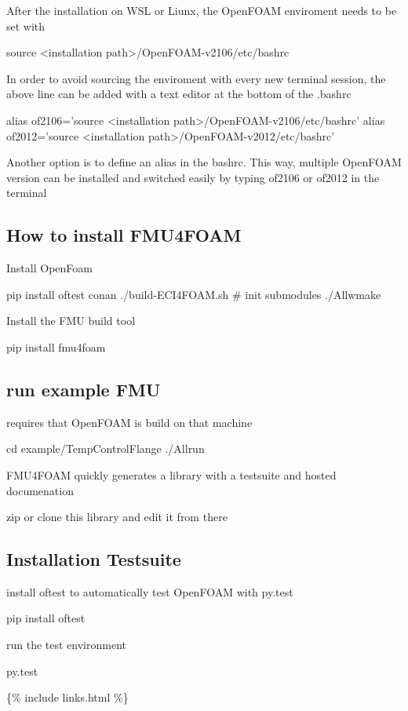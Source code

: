 After the installation on W\+SL or Liunx, the Open\+F\+O\+AM enviroment needs to be set with


\begin{DoxyCode}
source <installation path>/OpenFOAM-v2106/etc/bashrc
\end{DoxyCode}


In order to avoid sourcing the enviroment with every new terminal session, the above line can be added with a text editor at the bottom of the .bashrc


\begin{DoxyCode}
alias of2106='source <installation path>/OpenFOAM-v2106/etc/bashrc'
alias of2012='source <installation path>/OpenFOAM-v2012/etc/bashrc'
\end{DoxyCode}


Another option is to define an alias in the bashrc. This way, multiple Open\+F\+O\+AM version can be installed and switched easily by typing of2106 or of2012 in the terminal

\subsection*{How to install F\+M\+U4\+F\+O\+AM}

Install Open\+Foam 
\begin{DoxyCode}
pip install oftest conan
./build-ECI4FOAM.sh # init submodules
./Allwmake
\end{DoxyCode}


Install the F\+MU build tool


\begin{DoxyCode}
pip install fmu4foam
\end{DoxyCode}


\subsection*{run example F\+MU}

requires that Open\+F\+O\+AM is build on that machine


\begin{DoxyCode}
cd example/TempControlFlange
./Allrun
\end{DoxyCode}


F\+M\+U4\+F\+O\+AM quickly generates a library with a testsuite and hosted documenation

zip or clone this library and edit it from there

\subsection*{Installation Testsuite}

install oftest to automatically test Open\+F\+O\+AM with py.\+test


\begin{DoxyCode}
pip install oftest
\end{DoxyCode}


run the test environment 
\begin{DoxyCode}
py.test
\end{DoxyCode}


\{\% include links.\+html \%\} 